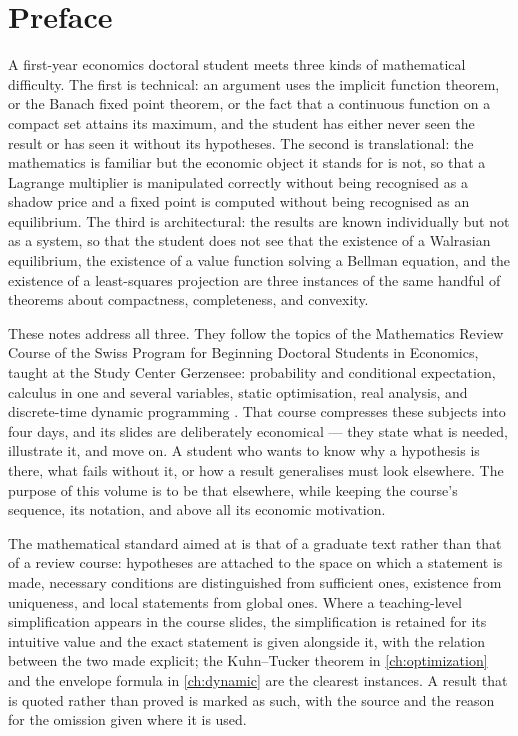 
\chapter*{Preface}

A first-year economics doctoral student meets three kinds of mathematical
difficulty. The first is technical: an argument uses the implicit function
theorem, or the Banach fixed point theorem, or the fact that a continuous
function on a compact set attains its maximum, and the student has either never
seen the result or has seen it without its hypotheses. The second is
translational: the mathematics is familiar but the economic object it stands for
is not, so that a Lagrange multiplier is manipulated correctly without being
recognised as a shadow price and a fixed point is computed without being
recognised as an equilibrium. The third is architectural: the results are known
individually but not as a system, so that the student does not see that the
existence of a Walrasian equilibrium, the existence of a value function solving
a Bellman equation, and the existence of a least-squares projection are three
instances of the same handful of theorems about compactness, completeness, and
convexity.

These notes address all three. They follow the topics of the Mathematics Review
Course of the Swiss Program for Beginning Doctoral Students in Economics, taught
at the Study Center Gerzensee: probability and conditional expectation, calculus
in one and several variables, static optimisation, real analysis, and
discrete-time dynamic programming \autocite{fukuda2026logistics}. That course
compresses these subjects into four days, and its slides are deliberately
economical --- they state what is needed, illustrate it, and move on. A student
who wants to know why a hypothesis is there, what fails without it, or how a
result generalises must look elsewhere. The purpose of this volume is to be that
elsewhere, while keeping the course's sequence, its notation, and above all its
economic motivation.

The mathematical standard aimed at is that of a graduate text rather than that
of a review course: hypotheses are attached to the space on which a statement is
made, necessary conditions are distinguished from sufficient ones, existence from
uniqueness, and local statements from global ones. Where a teaching-level
simplification appears in the course slides, the simplification is retained for
its intuitive value and the exact statement is given alongside it, with the
relation between the two made explicit; the Kuhn--Tucker theorem in
\autoref{ch:optimization} and the envelope formula in \autoref{ch:dynamic} are
the clearest instances. A result that is quoted rather than proved is marked as
such, with the source and the reason for the omission given where it is used.

